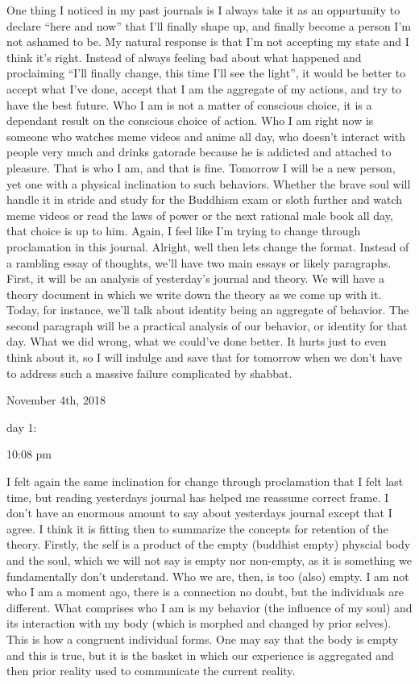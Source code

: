 One thing I noticed in my past journals is I always take it as an
oppurtunity to declare ``here and now'' that I'll finally shape up, and
finally become a person I'm not ashamed to be. My natural response is
that I'm not accepting my state and I think it's right. Instead of
always feeling bad about what happened and proclaiming ``I'll finally
change, this time I'll see the light'', it would be better to accept
what I've done, accept that I am the aggregate of my actions, and try to
have the best future. Who I am is not a matter of conscious choice, it
is a dependant result on the conscious choice of action. Who I am right
now is someone who watches meme videos and anime all day, who doesn't
interact with people very much and drinks gatorade because he is
addicted and attached to pleasure. That is who I am, and that is fine.
Tomorrow I will be a new person, yet one with a physical inclination to
such behaviors. Whether the brave soul will handle it in stride and
study for the Buddhism exam or sloth further and watch meme videos or
read the laws of power or the next rational male book all day, that
choice is up to him. Again, I feel like I'm trying to change through
proclamation in this journal. Alright, well then lets change the format.
Instead of a rambling essay of thoughts, we'll have two main essays or
likely paragraphs. First, it will be an analysis of yesterday's journal
and theory. We will have a theory document in which we write down the
theory as we come up with it. Today, for instance, we'll talk about
identity being an aggregate of behavior. The second paragraph will be a
practical analysis of our behavior, or identity for that day. What we
did wrong, what we could've done better. It hurts just to even think
about it, so I will indulge and save that for tomorrow when we don't
have to address such a massive failure complicated by shabbat.

\bigskip
\bigskip
November 4th, 2018

day 1:

10:08 pm

I felt again the same inclination for change through proclamation that I
felt last time, but reading yesterdays journal has helped me reassume
correct frame. I don't have an enormous amount to say about yesterdays
journal except that I agree. I think it is fitting then to summarize the
concepts for retention of the theory. Firstly, the self is a product of
the empty (buddhist empty) physcial body and the soul, which we will not
say is empty nor non-empty, as it is something we fundamentally don't
understand. Who we are, then, is too (also) empty. I am not who I am a
moment ago, there is a connection no doubt, but the individuals are
different. What comprises who I am is my behavior (the influence of my
soul) and its interaction with my body (which is morphed and changed by
prior selves). This is how a congruent individual forms. One may say
that the body is empty and this is true, but it is the basket in which
our experience is aggregated and then prior reality used to communicate
the current reality.


